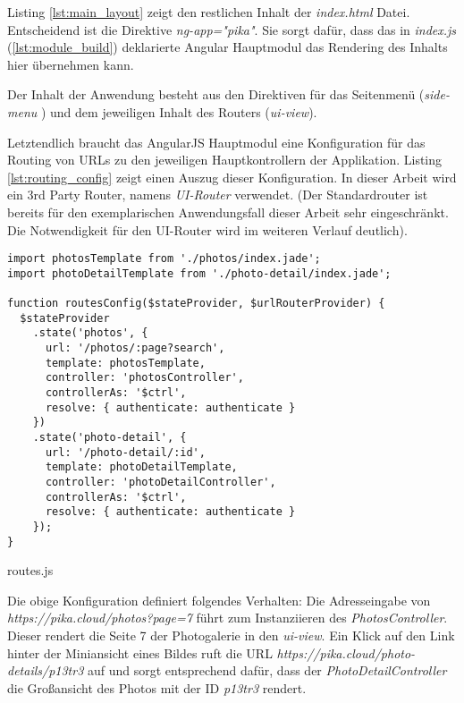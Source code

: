 Listing \ref{lst:main_layout} zeigt den restlichen Inhalt der \textit{index.html} Datei. Entscheidend ist die Direktive \textit{ng-app="pika"}. Sie sorgt dafür, dass das in \textit{index.js} (\ref{lst:module_build}) deklarierte Angular Hauptmodul das Rendering des Inhalts hier übernehmen kann.

Der Inhalt der Anwendung besteht aus den Direktiven für das Seitenmenü (\textit{side-menu} ) und dem jeweiligen Inhalt des Routers (\textit{ui-view}). 

Letztendlich braucht das AngularJS Hauptmodul eine Konfiguration für das Routing von URLs zu den jeweiligen Hauptkontrollern der Applikation. Listing \ref{lst:routing_config} zeigt einen Auszug dieser Konfiguration. In dieser Arbeit wird ein 3rd Party Router, namens \textit{UI-Router} verwendet. (Der Standardrouter ist bereits für den exemplarischen Anwendungsfall dieser Arbeit sehr eingeschränkt. Die Notwendigkeit für den UI-Router wird im weiteren Verlauf deutlich).

\begin{listing}[H]
\begin{verbatim}
import photosTemplate from './photos/index.jade';
import photoDetailTemplate from './photo-detail/index.jade';

function routesConfig($stateProvider, $urlRouterProvider) {
  $stateProvider
    .state('photos', {
      url: '/photos/:page?search',
      template: photosTemplate,
      controller: 'photosController',
      controllerAs: '$ctrl',
      resolve: { authenticate: authenticate }
    })
    .state('photo-detail', {
      url: '/photo-detail/:id',
      template: photoDetailTemplate,
      controller: 'photoDetailController',
      controllerAs: '$ctrl',
      resolve: { authenticate: authenticate }
    });
}

\end{verbatim}
\caption{routes.js}
\label{lst:routing_config}
\end{listing}

Die obige Konfiguration definiert folgendes Verhalten:
Die Adresseingabe von \textit{https://pika.cloud/photos?page=7} führt zum Instanziieren des \textit{PhotosController}. Dieser rendert die Seite 7 der Photogalerie in den \textit{ui-view}. Ein Klick auf den Link hinter der Miniansicht eines Bildes ruft die URL \textit{https://pika.cloud/photo-details/p13tr3} auf und sorgt entsprechend dafür, dass der \textit{PhotoDetailController} die Großansicht des Photos mit der ID  \textit{p13tr3} rendert.

